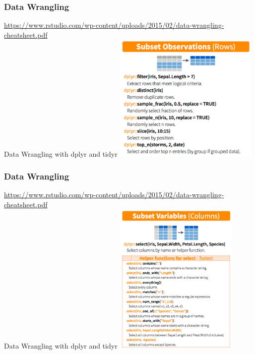 \documentclass{beamer}
\begin{document}
\begin{frame}[fragile]
	\frametitle{Data Wrangling}
	\centering \tiny \url{https://www.rstudio.com/wp-content/uploads/2015/02/data-wrangling-cheatsheet.pdf}\\
	\centering \Large Data Wrangling with dplyr and tidyr
	\vspace{10pt}
	\includegraphics[width=7cm]{figures/dp3.png}

\end{frame}

\begin{frame}[fragile]
	\frametitle{Data Wrangling}
	\centering \tiny \url{https://www.rstudio.com/wp-content/uploads/2015/02/data-wrangling-cheatsheet.pdf}\\
	\centering \Large Data Wrangling with dplyr and tidyr
	\vspace{10pt}
	\includegraphics[width=6cm]{figures/dp4.png}

\end{frame}
\end{document}
